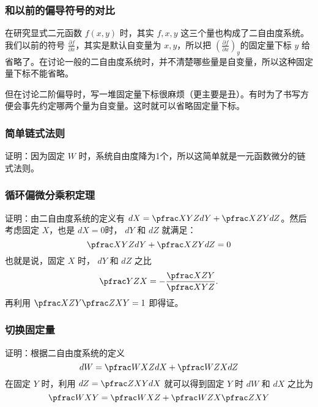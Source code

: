 \documentclass[CJK,13pt]{beamer}
\begin{document}
  \begin{frame}
    \frametitle{和以前的偏导符号的对比}
    在研究显式二元函数 $f(x,y)$ 时，其实 $f,x,y$ 这三个量也构成了二自由度系统。我们以前的符号 $\frac{\partial f}{\partial x}$，其实是默认自变量为 $x,y$，所以把 $\left(\frac{\partial f}{\partial x}\right)_y$的固定量下标 $y$ 给省略了。在讨论一般的二自由度系统时，并不清楚哪些量是自变量，所以这种固定量下标不能省略。

    \skiplines
    
    但在讨论二阶偏导时，写一堆固定量下标很麻烦（更主要是丑）。有时为了书写方便会事先约定哪两个量为自变量。这时就可以省略固定量下标。
  \end{frame}
  

\begin{frame}
  \frametitle{简单链式法则}

  \skiplines

  证明：因为固定 $W$ 时，系统自由度降为1个，所以这简单就是一元函数微分的链式法则。
\end{frame}  


\begin{frame}
  \frametitle{循环偏微分乘积定理}

 {\small  证明：由二自由度系统的定义有 $dX = \pfrac XYZ dY +\pfrac XZY dZ$。然后考虑固定 $X$，也是 $dX=0$时， $dY$ 和 $dZ$ 就满足：
  $$ \pfrac XYZ dY +\pfrac XZY dZ = 0$$
  也就是说，固定 $X$ 时， $dY$ 和 $dZ$ 之比
  $$\pfrac YZX = - \frac{\pfrac XZY}{\pfrac XYZ}.$$
  再利用 $ \pfrac XZY \pfrac ZXY = 1$ 即得证。
  }
\end{frame}  

\begin{frame}
  \frametitle{切换固定量}

  {\small
    证明：根据二自由度系统的定义
    $$ dW = \pfrac WXZ dX + \pfrac WZX dZ $$
    在固定 $Y$ 时，利用 $ dZ = \pfrac ZXY dX$ 就可以得到固定 $Y$ 时 $dW$ 和 $dX$ 之比为
    $$\pfrac WXY = \pfrac WXZ + \pfrac WZX \pfrac ZXY $$
    
    }
  
\end{frame}
\end{document}
